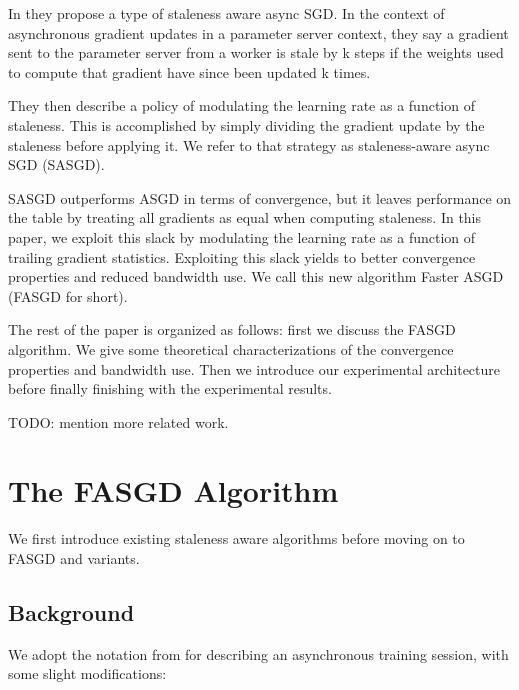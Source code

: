 \documentclass{article} %
\begin{document}
In \cite{Suyog} they propose a type of staleness aware async SGD.
In the context of asynchronous gradient updates in a parameter server context, they say a gradient
sent to the parameter server from a worker is stale by k steps if the weights used to compute that
gradient have since been updated k times.

They then describe a policy of modulating the learning rate as a function of staleness.
This is accomplished by simply dividing the gradient update by the staleness before applying it.
We refer to that strategy as staleness-aware async SGD (SASGD).

SASGD outperforms ASGD in terms of convergence, but it leaves performance on the table by treating all gradients as equal when computing staleness.
In this paper, we exploit this slack by modulating the learning rate as a function of trailing gradient statistics.
Exploiting this slack yields to better convergence properties and reduced bandwidth use.
We call this new algorithm Faster ASGD (FASGD for short).

The rest of the paper is organized as follows: first we discuss the FASGD algorithm.
We give some theoretical characterizations of the convergence properties and bandwidth use.
Then we introduce our experimental architecture before finally finishing with the experimental results.

TODO: mention more related work.

\section{The FASGD Algorithm}

We first introduce existing staleness aware algorithms before moving on to FASGD and variants.

\subsection{Background}
We adopt the notation from \cite{Suyog} for describing an asynchronous training session,
with some slight modifications:
\end{document}
